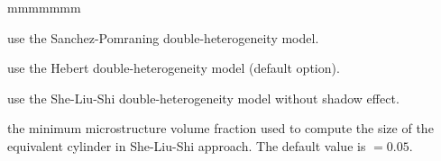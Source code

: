 \begin{ListeDeDescription}{mmmmmmm}
\item[\moc{SAPO}] use the Sanchez-Pomraning double-heterogeneity model.\cite{sapo}

\item[\moc{HEBE}] use the Hebert double-heterogeneity model (default option).\cite{BIHET}

\item[\moc{SLSI}] use the She-Liu-Shi double-heterogeneity model without shadow effect.\cite{She2017}

\item[\dusa{frtm}] the minimum microstructure volume fraction used to compute the size of the equivalent cylinder in She-Liu-Shi approach. The default value is  $=0.05$.

\end{ListeDeDescription}
\eject
